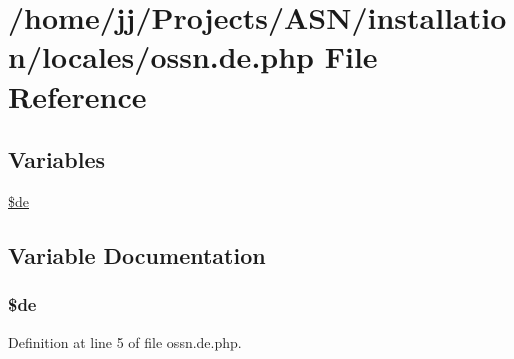 \hypertarget{installation_2locales_2ossn_8de_8php}{}\section{/home/jj/\+Projects/\+A\+S\+N/installation/locales/ossn.de.\+php File Reference}
\label{installation_2locales_2ossn_8de_8php}
\subsection*{Variables}
\begin{DoxyCompactItemize}
\item 
\hyperlink{installation_2locales_2ossn_8de_8php_aab7de7e51b4580005f63dd4cf5e17311}{\$de}
\end{DoxyCompactItemize}


\subsection{Variable Documentation}
\subsubsection[{\texorpdfstring{\$de}{$de}}]{\setlength{\rightskip}{0pt plus 5cm}\$de}\hypertarget{installation_2locales_2ossn_8de_8php_aab7de7e51b4580005f63dd4cf5e17311}{}\label{installation_2locales_2ossn_8de_8php_aab7de7e51b4580005f63dd4cf5e17311}


Definition at line 5 of file ossn.\+de.\+php.

